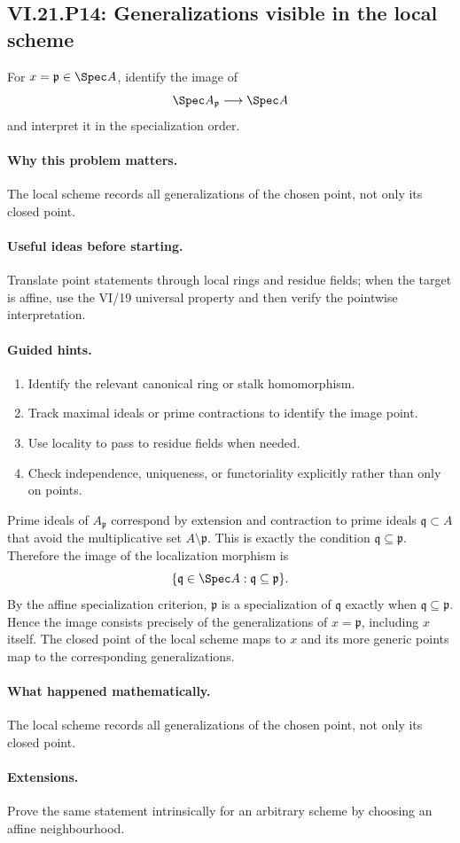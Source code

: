 \subsection*{VI.21.P14: Generalizations visible in the local scheme}
\begin{problem}\label{prob:vi21-p14}
For $x=\mathfrak p\in\Spec A$, identify the image of
\[
\Spec A_{\mathfrak p}\longrightarrow\Spec A
\]
and interpret it in the specialization order.
\end{problem}

\ifdefined\FullProblemDossiers
\paragraph{Why this problem matters.}
The local scheme records all generalizations of the chosen point, not only its closed point.

\paragraph{Useful ideas before starting.}
Translate point statements through local rings and residue fields; when the target is affine, use the VI/19 universal property and then verify the pointwise interpretation.

\paragraph{Guided hints.}
\begin{enumerate}
\item Identify the relevant canonical ring or stalk homomorphism.
\item Track maximal ideals or prime contractions to identify the image point.
\item Use locality to pass to residue fields when needed.
\item Check independence, uniqueness, or functoriality explicitly rather than only on points.
\end{enumerate}

\begin{solution}
Prime ideals of $A_{\mathfrak p}$ correspond by extension and contraction to prime ideals
$\mathfrak q\subset A$ that avoid the multiplicative set $A\setminus\mathfrak p$.  This is exactly
the condition $\mathfrak q\subseteq\mathfrak p$.  Therefore the image of the localization morphism
is
\[
\{\mathfrak q\in\Spec A:\mathfrak q\subseteq\mathfrak p\}.
\]
By the affine specialization criterion, $\mathfrak p$ is a specialization of $\mathfrak q$ exactly
when $\mathfrak q\subseteq\mathfrak p$.  Hence the image consists precisely of the generalizations
of $x=\mathfrak p$, including $x$ itself.  The closed point of the local scheme maps to $x$ and its
more generic points map to the corresponding generalizations.
\end{solution}

\paragraph{What happened mathematically.}
The local scheme records all generalizations of the chosen point, not only its closed point.

\paragraph{Extensions.}
Prove the same statement intrinsically for an arbitrary scheme by choosing an affine neighbourhood.
\fi
